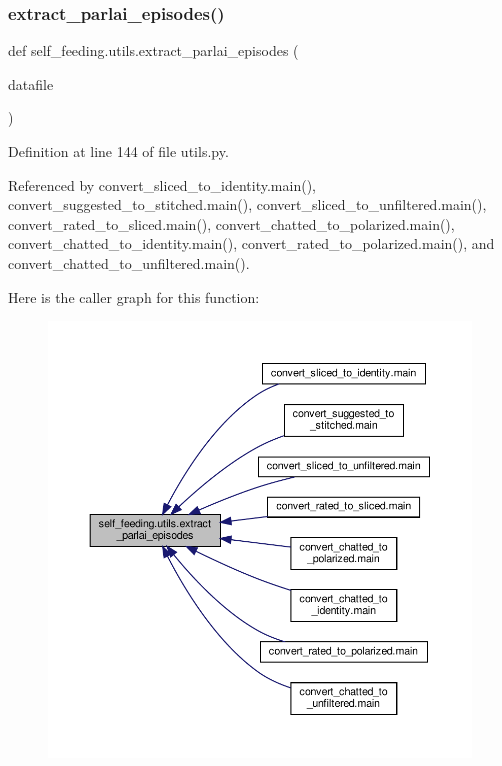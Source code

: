 \subsubsection{\texorpdfstring{extract\+\_\+parlai\+\_\+episodes()}{extract\_parlai\_episodes()}}
{\footnotesize\ttfamily def self\+\_\+feeding.\+utils.\+extract\+\_\+parlai\+\_\+episodes (\begin{DoxyParamCaption}\item[{}]{datafile }\end{DoxyParamCaption})}



Definition at line 144 of file utils.\+py.



Referenced by convert\+\_\+sliced\+\_\+to\+\_\+identity.\+main(), convert\+\_\+suggested\+\_\+to\+\_\+stitched.\+main(), convert\+\_\+sliced\+\_\+to\+\_\+unfiltered.\+main(), convert\+\_\+rated\+\_\+to\+\_\+sliced.\+main(), convert\+\_\+chatted\+\_\+to\+\_\+polarized.\+main(), convert\+\_\+chatted\+\_\+to\+\_\+identity.\+main(), convert\+\_\+rated\+\_\+to\+\_\+polarized.\+main(), and convert\+\_\+chatted\+\_\+to\+\_\+unfiltered.\+main().

Here is the caller graph for this function\+:
\nopagebreak
\begin{figure}[H]
\begin{center}
\leavevmode
\includegraphics[width=350pt]{namespaceself__feeding_1_1utils_ab5320af5eed839794f63c16ab25ec8a8_icgraph}
\end{center}
\end{figure}
\mbox{\label{namespaceself__feeding_1_1utils_a6c6383b2b208a5cf7d3d043376411034}} 
